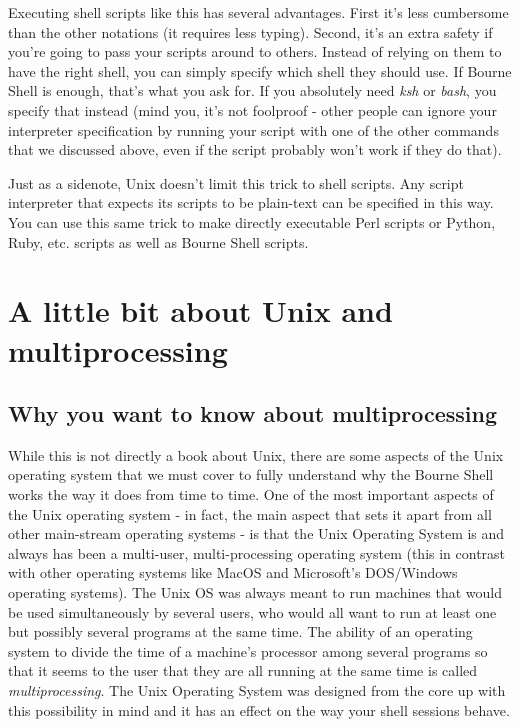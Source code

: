Executing shell scripts like this has several advantages. First it's less
cumbersome than the other notations (it requires less typing). Second, it's an
extra safety if you're going to pass your scripts around to others. Instead of
relying on them to have the right shell, you can simply specify which shell
they should use. If Bourne Shell is enough, that's what you ask for. If you
absolutely need \textit{ksh} or \textit{bash}, you specify that instead (mind
you, it's not foolproof - other people can ignore your interpreter
specification by running your script with one of the other commands that we
discussed above, even if the script probably won't work if they do that).

Just as a sidenote, Unix doesn't limit this trick to shell scripts. Any script
interpreter that expects its scripts to be plain-text can be specified in this
way. You can use this same trick to make directly executable Perl scripts or
Python, Ruby, etc. scripts as well as Bourne Shell scripts.

\section{A little bit about Unix and multiprocessing}
\subsection{Why you want to know about multiprocessing}
While this is not directly a book about Unix, there are some aspects of the
Unix operating system that we must cover to fully understand why the Bourne
Shell works the way it does from time to time.
One of the most important aspects of the Unix operating system - in fact, the
main aspect that sets it apart from all other main-stream operating systems -
is that the Unix Operating System is and always has been a multi-user,
multi-processing operating system (this in contrast with other operating
systems like MacOS and Microsoft's DOS/Windows operating systems). The Unix OS
was always meant to run machines that would be used simultaneously by several
users, who would all want to run at least one but possibly several programs at
the same time. The ability of an operating system to divide the time of a
machine's processor among several programs so that it seems to the user that
they are all running at the same time is called \textit{multiprocessing}. The
Unix Operating System was designed from the core up with this possibility in
mind and it has an effect on the way your shell sessions behave.

